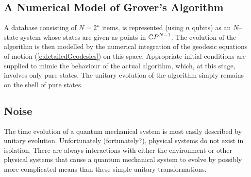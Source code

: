 %
%
\subsection{A Numerical Model of Grover's Algorithm}

A database consisting of $N=2^n$ items, is represented (using
$n$ qubits) as an $N$--state system whose states are given as
points in ${\mathbb{C} P}^{N-1}$.  The evolution of the algorithm is then 
modelled by the numerical integration of the geodesic equations 
of motion (\ref{e:detailedGeodesics}) on this space.
Appropriate initial conditions are supplied to mimic the behaviour of 
the actual algorithm, which, at this stage, involves only pure 
states.  The unitary evolution of the algorithm simply remains 
on the shell of pure states.


\subsection{Noise}

The time evolution of a quantum mechanical system is most easily
described by unitary evolution.
Unfortunately (fortunately?), physical systems do not exist in 
isolation.  There
are always interactions with either the environment or other 
physical systems that cause a quantum mechanical system to evolve 
by possibly more complicated means than these simple unitary 
transformations.

